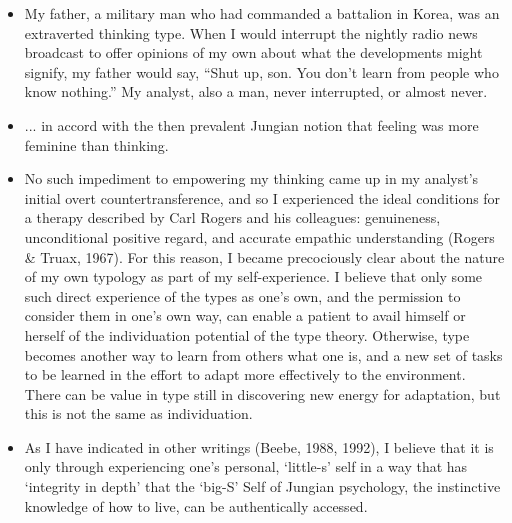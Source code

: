 \begin{itemize}

\item My father, a military man who had commanded a battalion in Korea, was an
extraverted thinking type. When I would interrupt the nightly radio news
broadcast to offer opinions of my own about what the developments might
signify, my father would say, ``Shut up, son. You don't learn from people who
know nothing.'' My analyst, also a man, never interrupted, or almost never.

\item ... in accord with the then prevalent Jungian notion that feeling was
more feminine than thinking.

\item No such impediment to empowering my thinking came up in my analyst's
initial overt countertransference, and so I experienced the ideal conditions
for a therapy described by Carl Rogers and his colleagues: genuineness,
unconditional positive regard, and accurate empathic understanding (Rogers \&
Truax, 1967). For this reason, I became precociously clear about the nature of
my own typology as part of my self-experience. I believe that only some such
direct experience of the types as one's own, and the permission to consider
them in one's own way, can enable a patient to avail himself or herself of the
individuation potential of the type theory. Otherwise, type becomes another way
to learn from others what one is, and a new set of tasks to be learned in the
effort to adapt more effectively to the environment. There can be value in type
still in discovering new energy for adaptation, but this is not the same as
individuation.

\item As I have indicated in other writings (Beebe, 1988, 1992), I believe that
it is only through experiencing one's personal, `little-s' self in a way that
has `integrity in depth' that the `big-S' Self of Jungian psychology, the
instinctive knowledge of how to live, can be authentically accessed.


\end{itemize}
